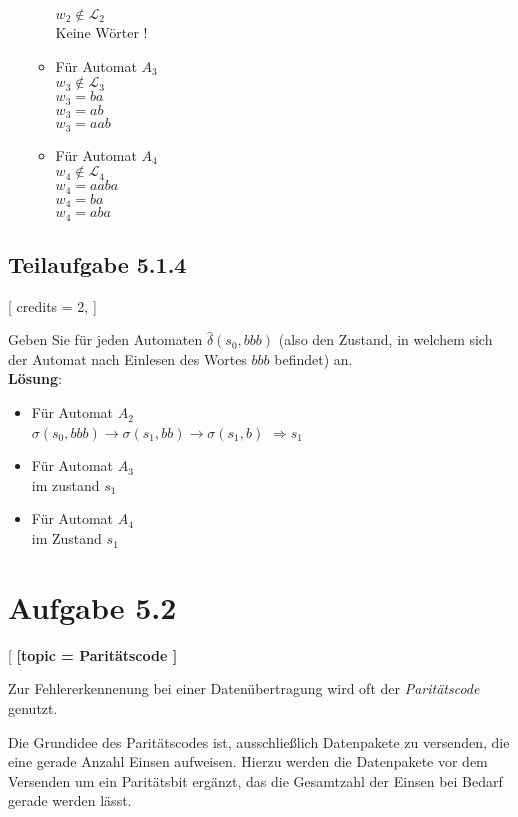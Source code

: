 \documentclass[12pt]{article}
\begin{document}
\begin{enumerate}
\begin{itemize}
$w_2 \not \in \mathcal{L}_2$\\
Keine Wörter !
\item Für Automat $A_3$\\
$w_3 \not \in \mathcal{L}_3$\\
$w_3= ba$\\
$w_3=ab$\\
$w_3=aab$ 
\item Für Automat $A_4$\\
$w_4 \not \in \mathcal{L}_4$\\
$w_4= aaba$\\
$w_4=ba$\\
$w_4=aba$ 
\end{itemize}
 \end{enumerate} 
  
  
  
  
  
 \subsection*{Teilaufgabe 5.1.4}[ 
 credits = 2, 
 ] 
  
 Geben Sie für jeden Automaten $\hat{\delta}(s_0,bbb)$ (also den Zustand, in welchem sich der Automat nach Einlesen des Wortes $bbb$ befindet) an. 
  \\
  \textbf{Lösung}:\\
  \begin{itemize}
\item Für Automat $A_2$\\
$\sigma(s_0,bbb)\to \sigma(s_1,bb) \to \sigma(s_1,b)$ $\Rightarrow s_1$
\item Für Automat $A_3$\\
im zustand $s_1$
\item Für Automat $A_4$\\
im Zustand $s_1$
\end{itemize}
  
  
  
 \section*{Aufgabe 5.2}[ 
\textbf{ [topic = Paritätscode 
 ] }
  
 Zur Fehlererkennenung bei einer Datenübertragung wird oft der \emph{Paritätscode} genutzt.  
  
 Die Grundidee des Paritätscodes ist, ausschließlich Datenpakete zu versenden, die eine 
 gerade Anzahl Einsen aufweisen. Hierzu werden die Datenpakete vor dem Versenden um ein 
 Paritätsbit ergänzt, das die Gesamtzahl der Einsen bei Bedarf gerade werden lässt.  
  
\end{document}
